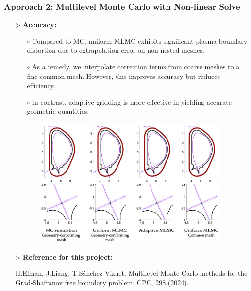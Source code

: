 \documentclass{beamer}
\begin{document}
\begin{frame}[t]
    \frametitle{Approach 2: Multilevel Monte Carlo with Non-linear Solve}
\begin{itemize}[leftmargin=5pt] 

\item[$\triangleright$] \textcolor{myblue3}{\bf Accuracy:} 
{\footnotesize
\begin{itemize}[leftmargin=5pt] 
    \item[$\circ$] Compared to MC, uniform MLMC exhibits significant plasma boundary distortion due to extrapolation error on non-nested meshes. 
    \item[$\circ$] As a remedy, we interpolate correction terms from coarse meshes to a fine common mesh. However, this improves accuracy but reduces efficiency.
    \item[$\circ$] In contrast, adaptive gridding is more effective in yielding accurate geometric quantities.
\end{itemize}
}


\vspace{-4mm}
\begin{figure}[ht!]\centering
\begin{tabular}{cc}
\includegraphics[height=0.4\linewidth]{Figure2.png}
\end{tabular}
\end{figure}



\item[$\triangleright$] {\bf Reference for this project:}
        
{\fontsize{8}{8}\selectfont \textcolor{mygray2}{H.Elman, J.Liang, T.Sánchez-Vizuet. Multilevel Monte Carlo methods for the Grad-Shafranov free boundary problem. CPC, 298 (2024).}
\par}
\end{itemize}
\end{frame}
\end{document}
